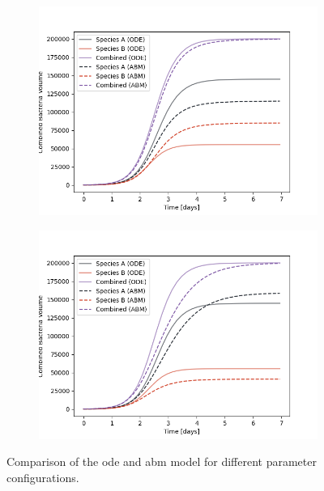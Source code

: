 \documentclass[10pt,A4paper]{article}
\numberwithin{equation}{section}
\begin{document}
\begin{figure}
    \begin{subfigure}[c]{0.5\textwidth}
        \includegraphics[width=\textwidth]{Figures/abm-inhomogenous/abm_ode_comparison.png}%
    \end{subfigure}%
    \begin{subfigure}[c]{0.5\textwidth}
        \includegraphics[width=\textwidth]{Figures/abm-random/abm_ode_comparison.png}%
    \end{subfigure}
    \caption{
        Comparison of the \ac{ode} and \ac{abm} model for different parameter configurations.
}
\end{figure}
\end{document}
